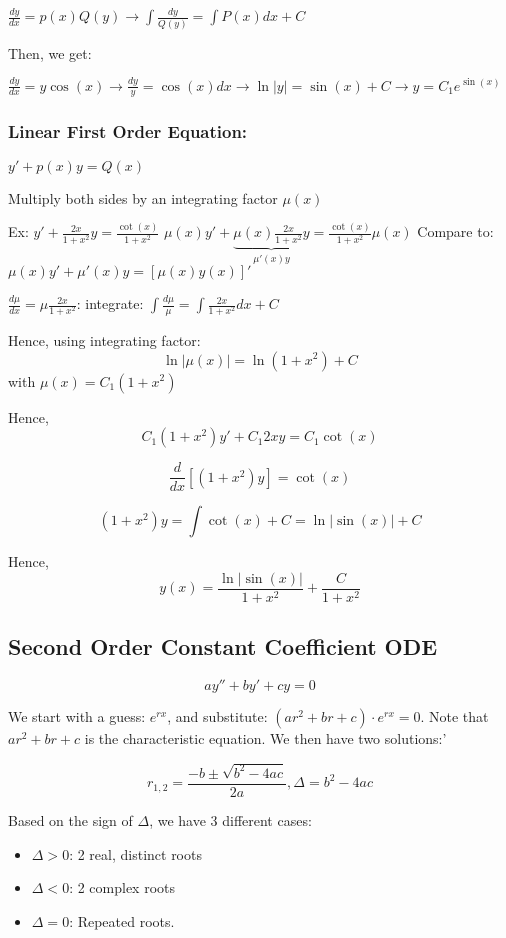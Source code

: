 \documentclass{article}
\begin{document}
$\frac{dy}{dx} = p(x) Q(y) \longrightarrow \int{\frac{dy}{Q(y)}} = \int{P(x) dx + C}$

Then, we get:

$\frac{dy}{dx} = y \cos(x) \rightarrow \frac{dy}{y} = \cos(x) dx \longrightarrow \ln{|y|} = \sin(x) + C \rightarrow y = C_1 e^{\sin(x)}$

\subsubsection{Linear First Order Equation:}

$y' + p(x) y = Q(x)$

Multiply both sides by an integrating factor $\mu(x)$

Ex: $y' + \frac{2x}{1 + x^2} y = \frac{\cot(x)}{1 + x^2}$
$\mu(x) y' + \underbrace{\mu(x) \frac{2x}{1 + x^2} y}_{\mu'(x) y} = \frac{\cot(x)}{1 + x^2} \mu(x)$
Compare to: $\mu(x) y' + \mu'(x) y = \left[\mu(x) y(x) \right]'$

$\frac{d \mu}{dx} = \mu \frac{2x}{1 + x^2}$: integrate: $\int{\frac{d \mu}{\mu}} = \int{\frac{2x}{1 + x^2} dx + C}$

Hence, using integrating factor: $$ \ln |\mu(x)| = \ln(1 + x^2) + C$$ with $\mu(x) = C_1 (1 + x^2)$

Hence, $$C_1(1 + x^2) y' + C_1 2xy = C_1 \cot(x)$$

$$\frac{d}{dx} \left[ (1 + x^2) y \right] = \cot(x)$$

$$(1+x^2)y = \int \cot(x) + C = \ln|\sin(x)| + C$$

Hence, $$y(x) = \frac{\ln|\sin(x)|}{1+x^2} + \frac{C}{1+x^2}$$

\subsection{Second Order Constant Coefficient ODE}

$$ay'' + by' + cy = 0$$

We start with a guess: $e^{rx}$, and substitute: $(ar^2 + br + c) \cdot e^{rx} = 0$. Note that $ar^2 + br + c$ is the characteristic equation. We then have two solutions:'

$$r_{1,2} = \frac{-b \pm \sqrt{b^2 - 4ac}}{2a}, \Delta = b^2 - 4ac$$

Based on the sign of $\Delta$, we have 3 different cases:

\begin{itemize}
    \item $\Delta > 0$: 2 real, distinct roots
    \item $\Delta < 0$: 2 complex roots
    \item $\Delta = 0$: Repeated roots. 
\end{itemize}
\end{document}
